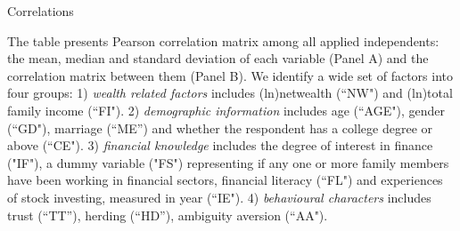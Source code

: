 \documentclass[ukenglish,nottitlepage,thmsb,11pt,letterpaper]{article}
\begin{document}
\begin{sidewaystable}
	\caption{Correlations }
	The table presents Pearson correlation matrix among all applied independents: the mean, median and standard deviation of each variable (Panel A) and the correlation matrix between them (Panel B).  We identify a wide set of factors into four groups: 1) \textit{wealth related factors} includes (ln)netwealth (``NW") and (ln)total family income (``FI").  2) \textit{demographic information} includes age (``AGE"), gender (``GD"),  marriage (``ME'') and whether the respondent has a college degree or above (``CE"). 3) \textit{financial knowledge} includes the degree of interest in finance ("IF"), a dummy variable ("FS") representing if any one or more family members have been working in financial sectors, financial literacy (``FL") and experiences of stock investing, measured in year  (``IE"). 4) \textit{behavioural characters} includes trust (``TT''), herding (``HD''), ambiguity aversion (``AA"). \\
	

\end{sidewaystable}
\end{document}
